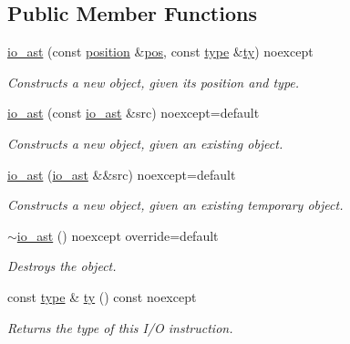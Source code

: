 \subsection*{Public Member Functions}
\begin{DoxyCompactItemize}
\item 
\hypertarget{classbfjit_1_1io__ast_ae1806cd887145045a5adae13dd2febc9}{}\label{classbfjit_1_1io__ast_ae1806cd887145045a5adae13dd2febc9} 
\hyperlink{classbfjit_1_1io__ast_ae1806cd887145045a5adae13dd2febc9}{io\+\_\+ast} (const \hyperlink{classbfjit_1_1position}{position} \&\hyperlink{classbfjit_1_1ast_a748b75683a33e11ad87b907ba0118c3d}{pos}, const \hyperlink{classbfjit_1_1io__ast_ae0b93ddde6f86aed45dd22b72d290414}{type} \&\hyperlink{classbfjit_1_1io__ast_a9f8324f95fa4cb43d16fc8d44b5066ea}{ty}) noexcept
\begin{DoxyCompactList}\small\item\em Constructs a new object, given its position and type. \end{DoxyCompactList}\item 
\hypertarget{classbfjit_1_1io__ast_ac8bf6505bbeebba0cf423c434fa69714}{}\label{classbfjit_1_1io__ast_ac8bf6505bbeebba0cf423c434fa69714} 
\hyperlink{classbfjit_1_1io__ast_ac8bf6505bbeebba0cf423c434fa69714}{io\+\_\+ast} (const \hyperlink{classbfjit_1_1io__ast}{io\+\_\+ast} \&src) noexcept=default
\begin{DoxyCompactList}\small\item\em Constructs a new object, given an existing object. \end{DoxyCompactList}\item 
\hypertarget{classbfjit_1_1io__ast_aed38e58dc90bf5d01afe83b185ad3470}{}\label{classbfjit_1_1io__ast_aed38e58dc90bf5d01afe83b185ad3470} 
\hyperlink{classbfjit_1_1io__ast_aed38e58dc90bf5d01afe83b185ad3470}{io\+\_\+ast} (\hyperlink{classbfjit_1_1io__ast}{io\+\_\+ast} \&\&src) noexcept=default
\begin{DoxyCompactList}\small\item\em Constructs a new object, given an existing temporary object. \end{DoxyCompactList}\item 
\hypertarget{classbfjit_1_1io__ast_abcf50683af099523532e79fa124ebf8d}{}\label{classbfjit_1_1io__ast_abcf50683af099523532e79fa124ebf8d} 
\hyperlink{classbfjit_1_1io__ast_abcf50683af099523532e79fa124ebf8d}{$\sim$io\+\_\+ast} () noexcept override=default
\begin{DoxyCompactList}\small\item\em Destroys the object. \end{DoxyCompactList}\item 
\hypertarget{classbfjit_1_1io__ast_a9f8324f95fa4cb43d16fc8d44b5066ea}{}\label{classbfjit_1_1io__ast_a9f8324f95fa4cb43d16fc8d44b5066ea} 
const \hyperlink{classbfjit_1_1io__ast_ae0b93ddde6f86aed45dd22b72d290414}{type} \& \hyperlink{classbfjit_1_1io__ast_a9f8324f95fa4cb43d16fc8d44b5066ea}{ty} () const noexcept
\begin{DoxyCompactList}\small\item\em Returns the type of this I/O instruction. \end{DoxyCompactList}\end{DoxyCompactItemize}
